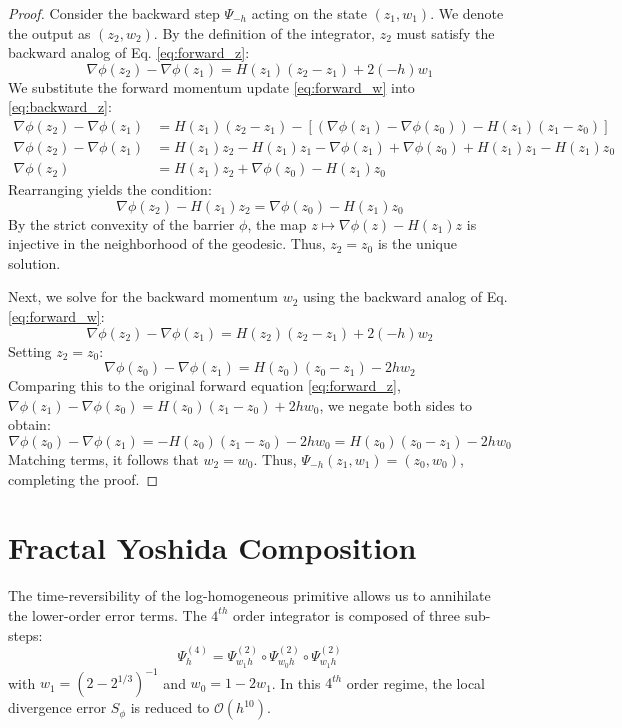 \documentclass[11pt,a4paper]{article}
\begin{document}
\begin{proof}
Consider the backward step $\Psi_{-h}$ acting on the state $(z_1, w_1)$. We denote the output as $(z_2, w_2)$. By the definition of the integrator, $z_2$ must satisfy the backward analog of Eq. \eqref{eq:forward_z}:
\begin{equation}
    \nabla \phi(z_2) - \nabla \phi(z_1) = H(z_1)(z_2 - z_1) + 2(-h) w_1 \label{eq:backward_z}
\end{equation}
We substitute the forward momentum update \eqref{eq:forward_w} into \eqref{eq:backward_z}:
\begin{align*}
    \nabla \phi(z_2) - \nabla \phi(z_1) &= H(z_1)(z_2 - z_1) - [ (\nabla \phi(z_1) - \nabla \phi(z_0)) - H(z_1)(z_1 - z_0) ] \\
    \nabla \phi(z_2) - \nabla \phi(z_1) &= H(z_1)z_2 - H(z_1)z_1 - \nabla \phi(z_1) + \nabla \phi(z_0) + H(z_1)z_1 - H(z_1)z_0 \\
    \nabla \phi(z_2) &= H(z_1)z_2 + \nabla \phi(z_0) - H(z_1)z_0
\end{align*}
Rearranging yields the condition:
\begin{equation}
    \nabla \phi(z_2) - H(z_1)z_2 = \nabla \phi(z_0) - H(z_1)z_0
\end{equation}
By the strict convexity of the barrier $\phi$, the map $z \mapsto \nabla \phi(z) - H(z_1)z$ is injective in the neighborhood of the geodesic. Thus, $z_2 = z_0$ is the unique solution.

Next, we solve for the backward momentum $w_2$ using the backward analog of Eq. \eqref{eq:forward_w}:
\begin{equation}
    \nabla \phi(z_2) - \nabla \phi(z_1) = H(z_2)(z_2 - z_1) + 2(-h) w_2
\end{equation}
Setting $z_2 = z_0$:
\begin{equation}
    \nabla \phi(z_0) - \nabla \phi(z_1) = H(z_0)(z_0 - z_1) - 2h w_2
\end{equation}
Comparing this to the original forward equation \eqref{eq:forward_z}, $\nabla \phi(z_1) - \nabla \phi(z_0) = H(z_0)(z_1 - z_0) + 2h w_0$, we negate both sides to obtain:
\begin{equation}
    \nabla \phi(z_0) - \nabla \phi(z_1) = -H(z_0)(z_1 - z_0) - 2h w_0 = H(z_0)(z_0 - z_1) - 2h w_0
\end{equation}
Matching terms, it follows that $w_2 = w_0$. Thus, $\Psi_{-h}(z_1, w_1) = (z_0, w_0)$, completing the proof.
\end{proof}


\section{Fractal Yoshida Composition}
The time-reversibility of the log-homogeneous primitive allows us to annihilate the lower-order error terms. The $4^{th}$ order integrator is composed of three sub-steps:
\begin{equation}
    \Psi_h^{(4)} = \Psi_{w_1 h}^{(2)} \circ \Psi_{w_0 h}^{(2)} \circ \Psi_{w_1 h}^{(2)}
\end{equation}
with $w_1 = (2 - 2^{1/3})^{-1}$ and $w_0 = 1 - 2w_1$. In this $4^{th}$ order regime, the local divergence error $S_\phi$ is reduced to $\mathcal{O}(h^{10})$.
\end{document}

